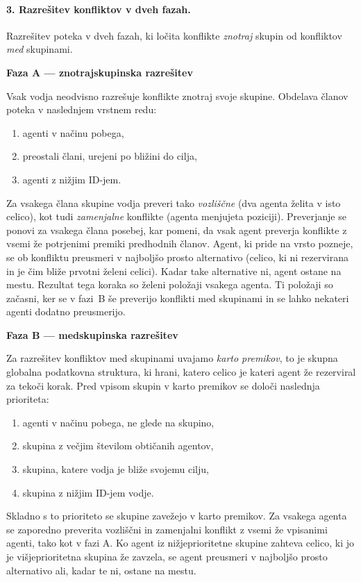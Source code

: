 \documentclass[sigconf,nonacm]{acmart}
\begin{document}
\paragraph{3. Razrešitev konfliktov v dveh fazah.}
Razrešitev poteka v dveh fazah, ki ločita konflikte \emph{znotraj} skupin od konfliktov \emph{med} skupinami.

\textbf{Faza A — znotrajskupinska razrešitev}

Vsak vodja neodvisno razrešuje konflikte znotraj svoje skupine. Obdelava članov poteka v naslednjem
vrstnem redu:
\begin{enumerate}
    \item agenti v načinu pobega,
    \item preostali člani, urejeni po bližini do cilja,
    \item agenti z nižjim ID-jem.
\end{enumerate}
Za vsakega člana skupine vodja preveri tako \textit{vozliščne} (dva agenta želita v isto celico), kot tudi \textit{zamenjalne} konflikte (agenta menjujeta
poziciji). Preverjanje se ponovi za vsakega člana posebej, kar pomeni, da vsak agent preverja konflikte z vsemi že
potrjenimi premiki predhodnih članov. Agent, ki pride na vrsto pozneje, se ob konfliktu
preusmeri v najboljšo prosto alternativo (celico, ki ni rezervirana in je čim bliže prvotni želeni
celici). Kadar take alternative ni, agent ostane na mestu. Rezultat tega koraka so želeni položaji vsakega agenta. Ti položaji so začasni, ker se v fazi~B še preverijo konflikti med skupinami in se lahko nekateri agenti dodatno preusmerijo.

\textbf{Faza B — medskupinska razrešitev}

Za razrešitev konfliktov med skupinami uvajamo \textit{karto premikov}, to je skupna globalna podatkovna
struktura, ki hrani, katero celico je kateri agent že rezerviral za tekoči korak. Pred vpisom skupin v
karto premikov se določi naslednja prioriteta:
\begin{enumerate}
    \item agenti v načinu pobega, ne glede na skupino,
    \item skupina z večjim številom obtičanih agentov,
    \item skupina, katere vodja je bliže svojemu cilju,
    \item skupina z nižjim ID-jem vodje.
\end{enumerate}
Skladno s to prioriteto se skupine zavežejo v karto premikov. Za vsakega agenta se zaporedno preverita vozliščni in zamenjalni konflikt z vsemi že vpisanimi agenti, tako
kot v fazi A. Ko agent iz nižjeprioritetne skupine zahteva celico, ki jo je višjeprioritetna skupina že zavzela, se agent preusmeri v najboljšo prosto alternativo ali,
kadar te ni, ostane na mestu.
\end{document}
